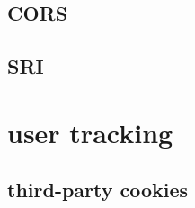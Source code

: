 \subsection{CORS}

\subsection{SRI}


\section{user tracking}


\subsection{third-party cookies}



%

